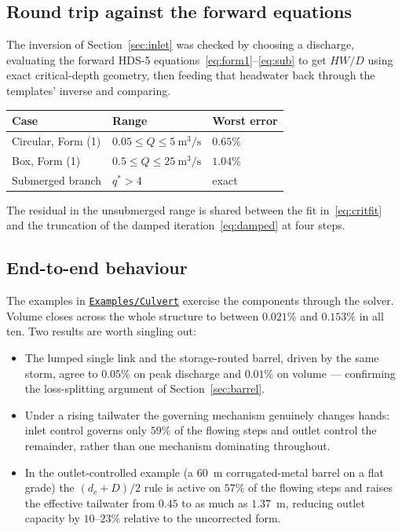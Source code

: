\documentclass[11pt,a4paper]{article}
\newcommand{\file}[1]{\texttt{\small #1}}
\newcommand{\ghtree}{https://github.com/ArashMassoudieh/OpenHydroQual/tree/master}
\newcommand{\exdir}[1]{\href{\ghtree/#1}{\file{#1}}}
\begin{document}
\subsection{Round trip against the forward equations}

The inversion of Section~\ref{sec:inlet} was checked by choosing a discharge,
evaluating the forward HDS-5 equations~\eqref{eq:form1}--\eqref{eq:sub} to get
$HW/D$ using exact critical-depth geometry, then feeding that headwater back
through the templates' inverse and comparing.

\begin{center}
\begin{tabular}{@{}lll@{}}
\toprule
\textbf{Case} & \textbf{Range} & \textbf{Worst error}\\
\midrule
Circular, Form (1) & $0.05\le Q\le5\ \mathrm{m^3/s}$ & $0.65\%$\\
Box, Form (1) & $0.5\le Q\le25\ \mathrm{m^3/s}$ & $1.04\%$\\
Submerged branch & $q^{*}>4$ & exact\\
\bottomrule
\end{tabular}
\end{center}

\noindent
The residual in the unsubmerged range is shared between the fit
in~\eqref{eq:critfit} and the truncation of the damped
iteration~\eqref{eq:damped} at four steps.

\subsection{End-to-end behaviour}

The examples in \exdir{Examples/Culvert} exercise the components through the
solver. Volume closes across the whole structure to between $0.021\%$ and
$0.153\%$ in all ten. Two results are worth singling out:

\begin{itemize}[leftmargin=1.5em]
\item The lumped single link and the storage-routed barrel, driven by the same
      storm, agree to $0.05\%$ on peak discharge and $0.01\%$ on volume ---
      confirming the loss-splitting argument of Section~\ref{sec:barrel}.
\item Under a rising tailwater the governing mechanism genuinely changes hands:
      inlet control governs only $59\%$ of the flowing steps and outlet control
      the remainder, rather than one mechanism dominating throughout.
\item In the outlet-controlled example (a 60~m corrugated-metal barrel on a flat
      grade) the $(d_c+D)/2$ rule is active on $57\%$ of the flowing steps and
      raises the effective tailwater from $0.45$ to as much as $1.37$~m,
      reducing outlet capacity by $10$--$23\%$ relative to the uncorrected form.
\end{itemize}
\end{document}
